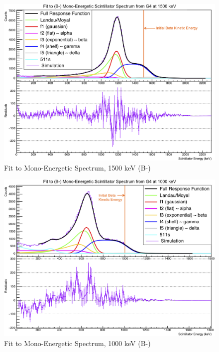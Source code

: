 \begin{figure}[h!!tb]
	\centering
	\includegraphics[width=.999\linewidth]
	{Figures/MonoFit_1500.png}
	\caption[Fit to Mono-Energetic Spectrum, 1500 keV]{Fit to Mono-Energetic Spectrum, 1500 keV (B-)}	
	\label{fig:lineshape_1500}
\end{figure}
\begin{figure}[h!!tb]
	\centering
	\includegraphics[width=.999\linewidth]
	{Figures/MonoFit_1000.png}
	\caption[Fit to Mono-Energetic Spectrum, 1000 keV]{Fit to Mono-Energetic Spectrum, 1000 keV (B-)}	
	\label{fig:lineshape_1000}
\end{figure}
